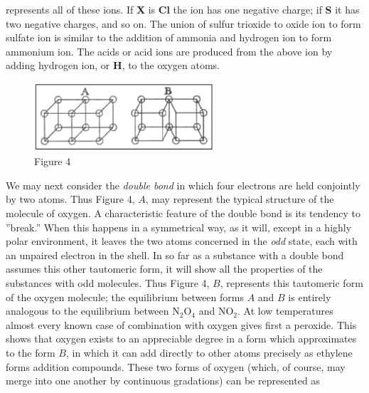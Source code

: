 \documentclass[11pt]{memoir}
\begin{document}
\bigskip
\begin{center}
\end{center}
\bigskip

\noindent represents all of these ions.  If \textbf{X} is \textbf{Cl} the ion has one negative charge; if \textbf{S} it has two negative charges, and so on.  The union of sulfur trioxide to oxide ion to form sulfate ion is similar to the addition of ammonia and hydrogen ion to form ammonium ion.  The acids or acid ions are produced from the above ion by adding hydrogen ion, or \textbf{H}, to the oxygen atoms.


\begin{figure}
	\begin{center}
		\includegraphics[width=0.6\textwidth]{images/lewis_figure4.png}
	\end{center}
	\caption*{Figure 4}


\end{figure}

We may next consider the \emph{double bond} in which four electrons are held conjointly by two atoms.  Thus Figure 4, $A$, may represent the typical structure of the molecule of oxygen.  A characteristic feature of the double bond is its tendency to ''break.''  When this happens in a symmetrical way, as it %
will, except in a highly polar environment, it leaves the two atoms concerned in the \emph{odd} state, each with an unpaired electron in the shell.  In so far as a substance with a double bond assumes this other tautomeric form, it will show all the properties of the substances with odd molecules.  Thus Figure 4, $B$, represents this tautomeric form of the oxygen molecule; the equilibrium between forms $A$ and $B$ is entirely analogous to the equilibrium between $\mathrm{N_2O_4}$ and $\mathrm{NO_2}$.  At low temperatures almost every known case of combination with oxygen gives first a peroxide.  This shows that oxygen exists to an appreciable degree in a form which approximates to the form $B$, in which it can add directly to other atoms precisely as ethylene forms addition compounds.  These two forms of oxygen (which, of course, may merge into one another by continuous gradations) can be represented as 
\renewcommand*\printatom[1]{\ensuremath{\mathbf{#1}}}
\end{document}
